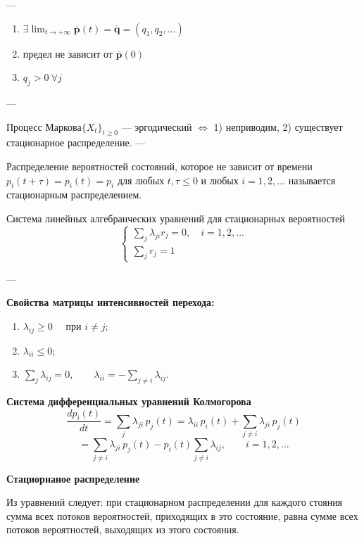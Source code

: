 ---

\begin{enumerate}
	\item
	      $\displaystyle
		      \exists \lim_{t \to +\infty}
		      \overline{\mathbf{p}}(t)
		      =
		      \overline{\mathbf{q}}
		      = (q_1, q_2, \ldots)
	      $

	\item предел не зависит от $\overline{\mathbf{p}}(0)$

	\item $q_j > 0 \ \forall j$
\end{enumerate}

---

Процесс Маркова$\{ X_t \}_{t \ge 0}$ — эргодический $\Longleftrightarrow$
1) неприводим, 2) существует стационарное распределение.
---

Распределение вероятностей состояний, которое не зависит от времени $p_i(t+\tau ) = p_i(t)=p_i$
для любых $t,\tau\leq 0$ и любых $i=1,2,...$ называется стационарным распределением.

Система линейных алгебраических уравнений для стационарных вероятностей
\[
	\begin{cases}
		\sum_j  \lambda_{ji} r_j = 0, \quad i=1,2,... \\
		\sum_j r_j = 1
	\end{cases}
\]

---

\textbf{Свойства матрицы интенсивностей перехода:}
\begin{enumerate}
	\item $\lambda_{ij} \ge 0 \quad$ при $i \ne j$;
	\item $\lambda_{ii} \le 0$;
	\item $\displaystyle \sum_j \lambda_{ij} = 0,
		      \qquad
		      \lambda_{ii} = - \sum_{j \ne i} \lambda_{ij}.$
\end{enumerate}

\vspace{1em}

\textbf{Система дифференциальных уравнений Колмогорова}
\[
	\frac{dp_i(t)}{dt}
	= \sum_j \lambda_{ji}\,p_j(t)
	= \lambda_{ii}\,p_i(t)
	+ \sum_{j \ne i} \lambda_{ji}\,p_j(t)
\]
\[
	= \sum_{j \ne i} \lambda_{ji}\,p_j(t)
	- p_i(t)\sum_{j \ne i} \lambda_{ij},
	\qquad i = 1, 2, \ldots
\]

\textbf{Стациорнаное распределение}

Из уравнений следует: при стационарном распределении для каждого стояния сумма всех потоков вероятностей, приходящих в это состояние, равна сумме всех потоков вероятностей, выходящих из этого состояния.

